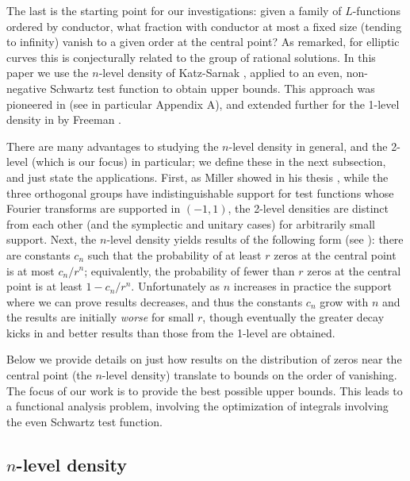 \documentclass[12pt, reqno]{amsart}
\numberwithin{equation}{section}
\theoremstyle{definition}
\theoremstyle{remark}
\begin{document}
The last is the starting point for our investigations: given a family of $L$-functions ordered by conductor, what fraction with conductor at most a fixed size (tending to infinity) vanish to a given order at the central point? As remarked, for elliptic curves this is conjecturally related to the group of rational solutions. In this paper we use the $n$-level density of Katz-Sarnak \cite{KatzSarnak, KatzSarnak2}, applied to an even, non-negative Schwartz test function to obtain upper bounds. This approach was pioneered in \cite{ILS} (see in particular Appendix A), and extended further for the 1-level density in by Freeman \cite{FreemanThesis, FreemanMiller}. 

There are many advantages to studying the $n$-level density in general, and the 2-level (which is our focus) in particular; we define these in the next subsection, and just state the applications. First, as Miller showed in his thesis \cite{Mil1}, while the three orthogonal groups have indistinguishable support for test functions whose Fourier transforms are supported in $(-1,1)$, the 2-level densities are distinct from each other (and the symplectic and unitary cases) for arbitrarily small support. Next, the $n$-level density yields results of the following form (see \cite{HM}): there are constants $c_n$ such that the probability of at least $r$ zeros at the central point is at most $c_n / r^n$; equivalently, the probability of fewer than $r$ zeros at the central point is at least $1 - c_n / r^n$. Unfortunately as $n$ increases in practice the support where we can prove results decreases, and thus the constants $c_n$ grow with $n$ and the results are initially \emph{worse} for small $r$, though eventually the greater decay kicks in and better results than those from the 1-level are obtained.

Below we provide details on just how results on the distribution of zeros near the central point (the $n$-level density) translate to bounds on the order of vanishing. The focus of our work is to provide the best possible upper bounds. This leads to a functional analysis problem, involving the optimization of integrals involving the even Schwartz test function.

\subsection{$n$-level density}
\end{document}
